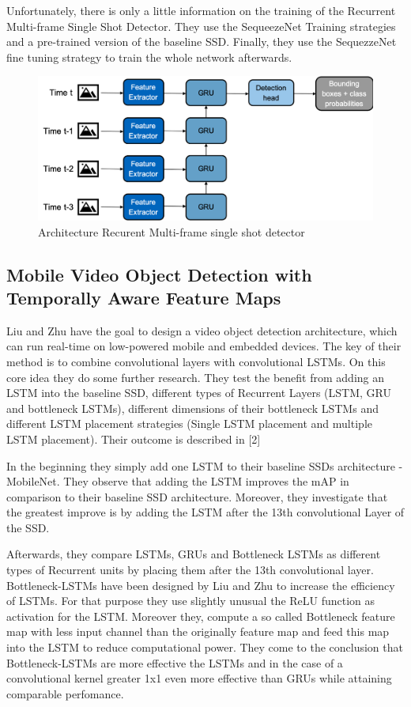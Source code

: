 \documentclass[conference]{IEEEtran}
\begin{document}
Unfortunately, there is only a little information on the training of the Recurrent Multi-frame Single Shot Detector. They use the SequeezeNet Training strategies and a pre-trained version of the baseline SSD. Finally, they use the SequezzeNet fine tuning strategy to train the whole network afterwards. 

\begin{figure} [h]
\includegraphics[width=\columnwidth]{RMFSSD}
\caption{Architecture Recurent Multi-frame single shot detector}
\end{figure}

\subsection{Mobile Video Object Detection with Temporally Aware Feature Maps}
Liu and Zhu have the goal to design a video object detection architecture, which can run real-time on low-powered mobile and embedded devices. The key of their method is to combine convolutional layers with convolutional LSTMs. On this core idea they do some further research. They test the benefit from adding an LSTM into the baseline SSD, different types of Recurrent Layers (LSTM, GRU and bottleneck LSTMs), different dimensions of their bottleneck LSTMs and different LSTM placement strategies (Single LSTM placement and multiple LSTM placement). Their outcome is described in [2]  \newline

In the beginning they simply add one LSTM to their baseline SSDs architecture - MobileNet. They observe that adding the LSTM improves the mAP in comparison to their baseline SSD architecture. Moreover, they investigate that the greatest improve is by adding the LSTM after the 13th convolutional Layer of the SSD. \newline

Afterwards, they compare LSTMs, GRUs and Bottleneck LSTMs as different types of Recurrent units by placing them after the 13th convolutional layer. Bottleneck-LSTMs have been designed by Liu and Zhu to increase the efficiency of LSTMs.  For that purpose they use slightly unusual the ReLU function as activation for the LSTM. Moreover they, compute a so called Bottleneck feature map with less input channel than the originally feature map and feed this map into the LSTM to reduce computational power. They come to the conclusion that Bottleneck-LSTMs are more effective the LSTMs and in the case of a convolutional kernel greater 1x1 even more effective than GRUs while attaining comparable perfomance. \newline
\end{document}
